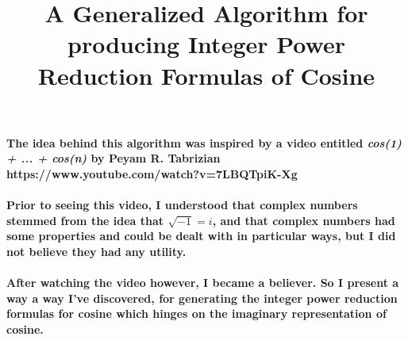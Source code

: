 \documentclass[12pt]{article}
\title{A Generalized Algorithm for producing Integer Power Reduction Formulas
of Cosine}
\begin{document}
\maketitle
\noindent \textbf{The idea behind this algorithm was inspired by a video 
entitled \textit{cos(1) + ... + cos(n)} by Peyam R. Tabrizian}
\\
\textbf{https://www.youtube.com/watch?v=7LBQTpiK-Xg}
\\
\\
\textbf{Prior to seeing this video, I understood that complex numbers stemmed from
the idea that $\sqrt{-1} = i$, and that complex numbers had some properties and
could be dealt with in particular ways, but I did not believe they had any utility.}
\\
\\
\textbf{After watching the video however, I became a believer. So I present a way
a way I've discovered, for generating the integer power reduction formulas for cosine which hinges on the imaginary representation of cosine.}
\end{document}
